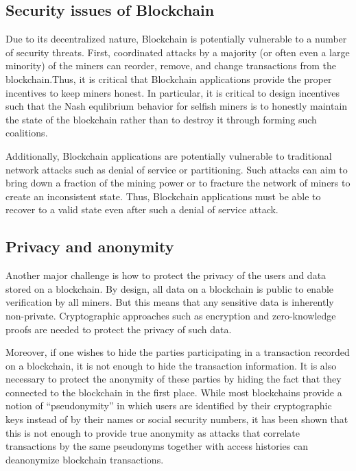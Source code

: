 \subsection{Security issues of Blockchain}
Due to its decentralized nature, Blockchain is potentially vulnerable to a number of security threats.  First, coordinated attacks by a majority (or often even a large minority) of the miners can reorder, remove, and change transactions from the blockchain.Thus, it is critical that Blockchain applications provide the proper incentives to keep miners honest.  In particular, it is critical to design incentives such that the Nash equlibrium behavior for selfish miners is to honestly maintain the state of the blockchain rather than to destroy it through forming such coalitions.

Additionally, Blockchain applications are potentially vulnerable to traditional network attacks such as denial of service or partitioning.  Such attacks can aim to bring down a fraction of the mining power or to fracture the network of miners to create an inconsistent state.  Thus, Blockchain applications must be able to recover to a valid state even after such a denial of service attack.

\subsection{Privacy and anonymity}
Another major challenge is how to protect the privacy of the users and data stored on a blockchain.  By design, all data on a blockchain is public to enable verification by all miners.  But this means that any sensitive data is inherently non-private.  Cryptographic approaches such as encryption and zero-knowledge proofs are needed to protect the privacy of such data.

Moreover, if one wishes to hide the parties participating in a transaction recorded on a blockchain, it is not enough to hide the transaction information.  It is also necessary to protect the anonymity of these parties by hiding the fact that they connected to the blockchain in the first place.  While most blockchains provide a notion of ``pseudonymity'' in which users are identified by their cryptographic keys instead of by their names or social security numbers, it has been shown that this is not enough to provide true anonymity as attacks that correlate transactions by the same pseudonyms together with access histories can deanonymize blockchain transactions.

